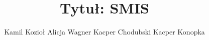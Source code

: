 \title { 
Tytuł: SMIS
}
\author {
Kamil Kozioł
Alicja Wagner
Kacper Chodubski
Kacper Konopka
}
\maketitle
